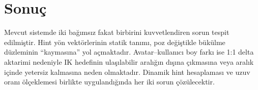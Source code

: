 \documentclass[11pt,a4paper]{article}
\begin{document}
\section{Sonu\c{c}}
\label{sec:sonuc}

Mevcut sistemde iki ba\u{g}{\i}ms{\i}z fakat birbirini kuvvetlendiren sorun
tespit edilmi\c{s}tir. Hint y\"on vekt\"orlerinin statik tan{\i}m{\i}, poz
de\u{g}i\c{s}tikle b\"uk\"ulme d\"uzleminin ``kaymas{\i}na'' yol a\c{c}maktad{\i}r.
Avatar--kullan{\i}c{\i} boy fark{\i} ise 1:1 delta aktarimi nedeniyle IK
hedefinin ula\c{s}{\i}labilir aral{\i}\u{g}{\i}n d{\i}\c{s}{\i}na \c{c}{\i}kmas{\i}na veya aral{\i}k
i\c{c}inde yetersiz kalmas{\i}na neden olmaktad{\i}r. Dinamik hint
hesaplamas{\i} ve uzuv oran{\i} \"ol\c{c}eklemesi birlikte uyguland{\i}\u{g}{\i}nda
her iki sorun \c{c}\"oz\"ulecektir.
\end{document}
